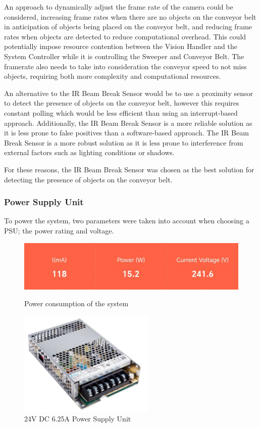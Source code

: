An approach to dynamically adjust the frame rate of the camera could be considered, increasing frame rates when there are no objects on the conveyor belt in anticipation of objects being placed on the conveyor belt, and reducing frame rates when objects are detected to reduce computational overhead. This could potentially impose resource contention between the Vision Handler and the System Controller while it is controlling the Sweeper and Conveyor Belt. The framerate also needs to take into consideration the conveyor speed to not miss objects, requiring both more complexity and computational resources.

An alternative to the IR Beam Break Sensor would be to use a proximity sensor to detect the presence of objects on the conveyor belt, however this requires constant polling which would be less efficient than using an interrupt-based approach. Additionally, the IR Beam Break Sensor is a more reliable solution as it is less prone to false positives than a software-based approach. The IR Beam Break Sensor is a more robust solution as it is less prone to interference from external factors such as lighting conditions or shadows.

For these reasons, the IR Beam Break Sensor was chosen as the best solution for detecting the presence of objects on the conveyor belt.

\subsubsection{Power Supply Unit}
To power the system, two parameters were taken into account when choosing a PSU; the power rating and voltage.

\begin{figure}[H]
    \hfill
    \begin{minipage}[h]{0.45\textwidth}
        \centering
        \includegraphics[width=\textwidth]{imgs/parts/powermeter.png}
        \caption{Power consumption of the system}
        \label{fig:powermeter}
    \end{minipage}
    \hfill
    \begin{minipage}[h]{0.45\textwidth}
        \centering
        \includegraphics[height=5cm]{imgs/parts/psu.jpg}
        \caption{24V DC 6.25A Power Supply Unit \cite{psu}}
    \end{minipage}
    \hfill
\end{figure}

